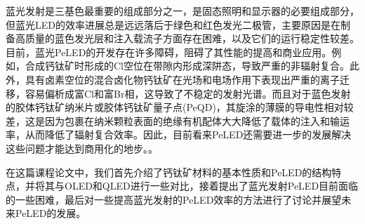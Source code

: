 \documentclass{phyasgn}\usepackage{nag}
\begin{document}
\par 蓝光发射是三基色最重要的组成部分之一，是固态照明和显示器的必要组成部分，但蓝光LED的效率进展总是远远落后于绿色和红色发光二极管，主要原因是在制备高质量的蓝色发光层和注入载流子方面存在困难，以及它们的运行稳定性较差。目前，蓝光PeLED的开发存在许多障碍，阻碍了其性能的提高和商业应用。例如，合成钙钛矿时形成的Cl空位在带隙内形成深阱态，导致严重的非辐射复合。此外，具有卤素空位的混合卤化物钙钛矿在光场和电场作用下表现出严重的离子迁移，容易偏析成富Cl和富Br相，这导致了不稳定的发射光谱。而且对于蓝色发射的胶体钙钛矿纳米片或胶体钙钛矿量子点(PeQD)，其旋涂的薄膜的导电性相对较差，这是因为包裹在纳米颗粒表面的绝缘有机配体大大降低了载体的注入和输运率，从而降低了辐射复合效率。因此，目前看来PeLED还需要进一步的发展解决这些问题才能达到商用化的地步。。
\par 在这篇课程论文中，我们首先介绍了钙钛矿材料的基本性质和PeLED的结构特点，并将其与OLED和QLED进行一些对比，接着提出了蓝光发射PeLED目前面临的一些困难，最后对一些提高蓝光发射的PeLED效率的方法进行了讨论并展望未来PeLED的发展。
\end{document}
